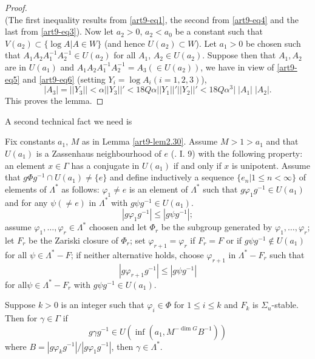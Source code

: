 \begin{proof}
\begin{equation}
\end{equation}
(The first inequality results from \ref{art9-eq1}, the second from \ref{art9-eq4} and the last from \ref{art9-eq3}). Now let $a_2 > 0$, $a_2 < a_0$ be a constant such that $V(a_2) \subset \{\log A | A \in W\}$ (and hence $U (a_2) \subset W$). Let $a_1 > 0$ be chosen such that $A_1 A_2 A^{-1}_1 A^{-1}_2 \in U (a_2)$  for all $A_1$, $A_2 \in U (a_2)$. Suppose then that $A_1, A_2$ are in $U (a_1)$ and $A_1 A_2 A_1^{-1} A^{-1}_2 = A_3 (\in U (a_2))$, we have in view of \ref{art9-eq5} and \ref{art9-eq6} (setting $Y_i = \log A_i (i = 1, 2, 3)$),
\begin{equation}
|A_3| = ||Y_3|| < \alpha ||Y_3||' < 18 Q \alpha ||Y_1||' ||Y_2 ||' < 18 Q \alpha^3\big| \; |A_1|\; |A_2|. \label{art9-eq7}
\end{equation}
This proves the lemma.
\end{proof}

A second technical fact we need is

\setcounter{lemma}{30}
\begin{lemma}\label{art9-lem2.31}
Fix constants $a_1$, $M$ as in Lemma \ref{art9-lem2.30}. Assume $M> 1> a_1$ and that $U(a_1)$ is a Zassenhaus neighbourhood of $e$ (\cf. I. 9) with the following property: an element $x \in \Gamma$ has a conjugate in $U (a_1)$ if and only if $x$ is unipotent. Assume that $g\Phi g^{-1} \cap U (a_1) \neq \{e\}$ and define inductively a sequence $\{e_n\big| 1 \leqslant n < \infty\}$ of elements of $\Lambda^\ast$ as follows: $\varphi_1 \neq e$ is an element of $\Lambda^\ast$ such that $g \varphi_1 g^{-1} \in U (a_1)$ and for any $\psi (\neq e)$ in $\Lambda^\ast$ with $g \psi g^{-1} \in U (a_1)$.
$$
|g \varphi_1 g^{-1}| \leqslant |g \psi g^{-1}|;
$$
assume $\varphi_1, \ldots, \varphi_r \in \Lambda^\ast$ choosen and let $\Phi_r$ be the subgroup generated by $\varphi_1, \ldots, \varphi_r$; let $F_r$ be the Zariski closure of $\Phi_r$; set $\varphi_{r+1} = \varphi_r$ if $F_r = F$ or if $g \psi g^{-1} \not\in U (a_1)$ for all $\psi \in \Lambda^{\ast}- F$; if neither alternative holds, choose $\varphi_{r+1}$ in $\Lambda^\ast-F_r$ such that 
$$
|g \varphi_{r+1} g^{-1}| \leqslant |g\psi g^{-1}|
$$
for all\pageoriginale $\psi \in \Lambda^\ast - F_r$ with $g \psi g^{-1} \in U (a_1)$.

Suppose $k >0$ is an integer such that $\varphi_i \in \Phi$ for $1 \leqslant i \leqslant k$ and $F_k$ is $\Sigma_u$-stable. Then for $\gamma \in \Gamma$ if
$$
g \gamma g^{-1} \in U (\inf (a_1, M^{-\dim G} B^{-1}))
$$
where $B =  |g \varphi_k g^{-1}| / |g \varphi_1 g^{-1}|$, then $\gamma \in \Lambda^\ast$.
\end{lemma}

